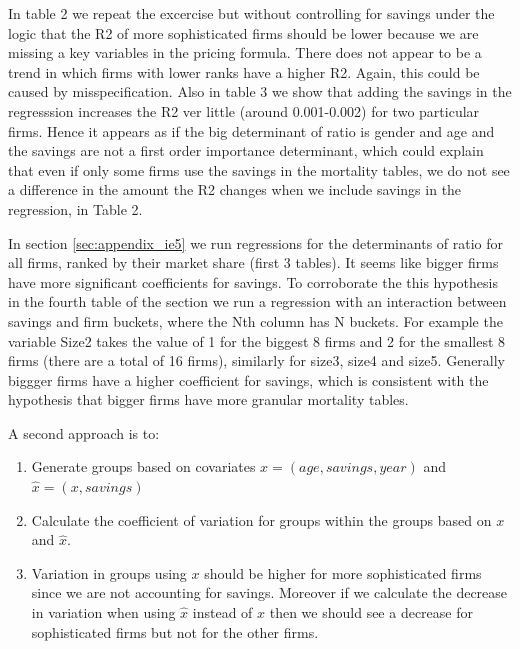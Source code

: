\documentclass[12pt]{article}
\begin{document}
In table 2 we repeat the excercise but without controlling for savings under the logic that the R2 of more sophisticated firms should be lower because we are missing a key variables in the pricing formula. There does not appear to be a trend in which firms with lower ranks have a higher R2. Again, this could be caused by misspecification. Also in table 3 we show that adding the savings in the regresssion increases the R2 ver little (around 0.001-0.002) for two particular firms. Hence it appears as if the big determinant of ratio is gender and age and the savings are not a first order importance determinant, which could explain that even if only some firms use the savings in the mortality tables, we do not see a difference in the amount the R2 changes when we include savings in the regression, in Table 2. 

In section \ref{sec:appendix_ie5} we run regressions for the determinants of ratio for all firms, ranked by their market share (first 3 tables). It seems like bigger firms have more significant coefficients for savings. To corroborate the this hypothesis in the fourth table of the section we run a regression with an interaction between savings and firm buckets, where the Nth column has N buckets. For example the variable Size2 takes the value of 1 for the biggest 8 firms and 2 for the smallest 8 firms (there are a total of 16 firms), similarly for size3, size4 and size5. Generally biggger firms have a higher coefficient for savings, which is consistent with the hypothesis that bigger firms have more granular mortality tables.





 

 



 

\newpage 

A second approach is to: 
\begin{enumerate}
    \item Generate groups based on covariates $x = (age, savings, year)$ and $\hat{x}= (x, savings)$ 
    \item Calculate the coefficient of variation for groups within the groups based on $x$ and $\hat{x}$. 
    \item Variation in groups using $x$ should be higher for more sophisticated firms since we are not accounting for savings. Moreover if we calculate the decrease in variation when using $\hat{x}$  instead of $x$ then we should see a decrease for sophisticated firms but not for the other firms. 
\end{enumerate}
\end{document}
